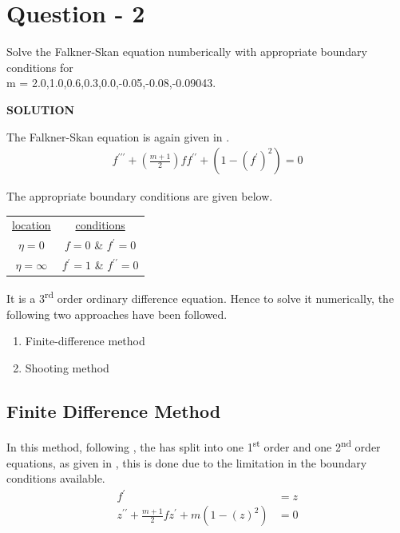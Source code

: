 \section{Question - 2}
Solve the Falkner-Skan equation numberically with appropriate boundary
conditions for \\ m = 2.0,1.0,0.6,0.3,0.0,-0.05,-0.08,-0.09043.

\vspace{0.5cm}
\textbf{SOLUTION}
\vspace{0.5cm}

\par The Falkner-Skan equation is again given in .
\begin{align}
    f^{\prime\prime\prime} + \left(\frac{m+1}{2}\right) f f^{\prime\prime} + \left(1 - \left(f^{\prime}\right)^2\right) = 0 \label{FS_equation}
\end{align}

\par The appropriate boundary conditions are given below.

\begin{table}[!h]
    \centering
    \begin{tabular}{cc}
        \underline{location} & \underline{conditions} \\
        $\eta = 0$ & $f = 0$ \& $f^{\prime} = 0$ \\
        $\eta = \infty$ & $f^{\prime} = 1$ \& $f^{\prime\prime} = 0$
    \end{tabular}
\end{table}

\par It is a 3\textsuperscript{rd} order ordinary difference equation.
Hence to solve it numerically, the following two approaches have been followed.

\begin{enumerate}
    \item Finite-difference method
    \item Shooting method
\end{enumerate}

\subsection{Finite Difference Method}
\par In this method, following \cite{ref_1}, the  has split into
one 1\textsuperscript{st} order and one 2\textsuperscript{nd} order equations,
as given in , this is done due to the limitation in the
boundary conditions available.
\begin{align}
    f^{\prime} &= z  \label{FD_eqn1} \\
    z^{\prime\prime} + \frac{m+1}{2} f z^{\prime} + m \left(1 - \left(z\right)^2\right) &= 0 \label{FD_eqn2}
\end{align}

